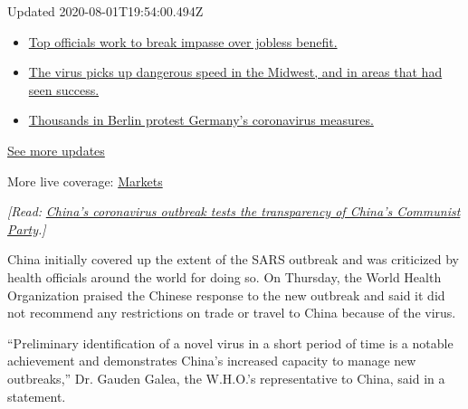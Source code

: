 Updated 2020-08-01T19:54:00.494Z

\begin{itemize}
\tightlist
\item
  \href{https://www.nytimes3xbfgragh.onion/2020/08/01/world/coronavirus-covid-19.html?action=click\&pgtype=Article\&state=default\&region=MAIN_CONTENT_1\&context=storylines_live_updates\#link-3ac56579}{Top
  officials work to break impasse over jobless benefit.}
\item
  \href{https://www.nytimes3xbfgragh.onion/2020/08/01/world/coronavirus-covid-19.html?action=click\&pgtype=Article\&state=default\&region=MAIN_CONTENT_1\&context=storylines_live_updates\#link-8796723}{The
  virus picks up dangerous speed in the Midwest, and in areas that had
  seen success.}
\item
  \href{https://www.nytimes3xbfgragh.onion/2020/08/01/world/coronavirus-covid-19.html?action=click\&pgtype=Article\&state=default\&region=MAIN_CONTENT_1\&context=storylines_live_updates\#link-25930521}{Thousands
  in Berlin protest Germany's coronavirus measures.}
\end{itemize}

\href{https://www.nytimes3xbfgragh.onion/2020/08/01/world/coronavirus-covid-19.html?action=click\&pgtype=Article\&state=default\&region=MAIN_CONTENT_1\&context=storylines_live_updates}{See
more updates}

More live coverage:
\href{https://www.nytimes3xbfgragh.onion/live/2020/07/31/business/stock-market-today-coronavirus?action=click\&pgtype=Article\&state=default\&region=MAIN_CONTENT_1\&context=storylines_live_updates}{Markets}

\emph{{[}Read:}
\href{https://www.nytimes3xbfgragh.onion/2020/01/21/world/asia/china-coronavirus-australia-wuhan-travel.html}{\emph{China's
coronavirus outbreak tests the transparency of China's Communist
Party}}\emph{.{]}}

China initially covered up the extent of the SARS outbreak and was
criticized by health officials around the world for doing so. On
Thursday, the World Health Organization praised the Chinese response to
the new outbreak and said it did not recommend any restrictions on trade
or travel to China because of the virus.

``Preliminary identification of a novel virus in a short period of time
is a notable achievement and demonstrates China's increased capacity to
manage new outbreaks,'' Dr. Gauden Galea, the W.H.O.'s representative to
China, said in a statement.

